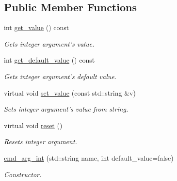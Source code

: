\subsection*{Public Member Functions}
\begin{DoxyCompactItemize}
\item 
\hypertarget{classcmd__arg__int_ac2d03f4b0cf2a17ccf0ca60aef0aa403}{int \hyperlink{classcmd__arg__int_ac2d03f4b0cf2a17ccf0ca60aef0aa403}{get\-\_\-value} () const }\label{classcmd__arg__int_ac2d03f4b0cf2a17ccf0ca60aef0aa403}

\begin{DoxyCompactList}\small\item\em Gets integer argument's value. \end{DoxyCompactList}\item 
\hypertarget{classcmd__arg__int_a7e0db1b82dd071fa0ce66e77b9109545}{int \hyperlink{classcmd__arg__int_a7e0db1b82dd071fa0ce66e77b9109545}{get\-\_\-default\-\_\-value} () const }\label{classcmd__arg__int_a7e0db1b82dd071fa0ce66e77b9109545}

\begin{DoxyCompactList}\small\item\em Gets integer argument's default value. \end{DoxyCompactList}\item 
\hypertarget{classcmd__arg__int_a04883e51fb34d7c2e3b9c6b6e3151ad8}{virtual void \hyperlink{classcmd__arg__int_a04883e51fb34d7c2e3b9c6b6e3151ad8}{set\-\_\-value} (const std\-::string \&v)}\label{classcmd__arg__int_a04883e51fb34d7c2e3b9c6b6e3151ad8}

\begin{DoxyCompactList}\small\item\em Sets integer argument's value from string. \end{DoxyCompactList}\item 
\hypertarget{classcmd__arg__int_a97f21fe9b1e529db6fc24754901bdb03}{virtual void \hyperlink{classcmd__arg__int_a97f21fe9b1e529db6fc24754901bdb03}{reset} ()}\label{classcmd__arg__int_a97f21fe9b1e529db6fc24754901bdb03}

\begin{DoxyCompactList}\small\item\em Resets integer argument. \end{DoxyCompactList}\item 
\hyperlink{classcmd__arg__int_a19c0e1b05106ded2c562768cbe1cffe3}{cmd\-\_\-arg\-\_\-int} (std\-::string name, int default\-\_\-value=false)
\begin{DoxyCompactList}\small\item\em Constructor. \end{DoxyCompactList}\end{DoxyCompactItemize}


